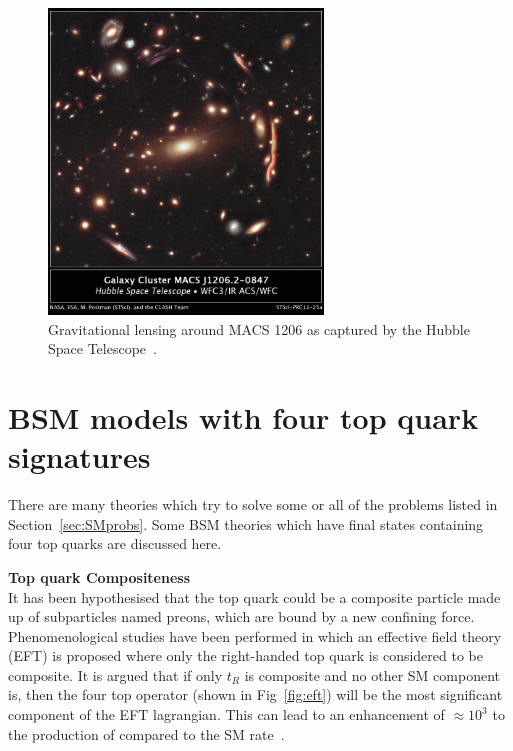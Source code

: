 \begin{figure}[ht!]
\centering
    \includegraphics[width=0.65\textwidth]{images/Theory/lensing2.jpg}
    \caption{Gravitational lensing around MACS 1206 as captured by the Hubble Space Telescope~\cite{Glens}.}
    \label{fig:Glens}
\end{figure}


\section{BSM models with four top quark signatures ~\label{sec:BSMmodels}}

There are many theories which try to solve some or all of the problems listed in Section~\ref{sec:SMprobs}. Some BSM theories which have final states containing four top quarks are discussed here. 

\textbf{Top quark Compositeness}\\
It has been hypothesised that the top quark could be a composite particle made up of subparticles named preons, which are bound by a new confining force. Phenomenological studies have been performed in which an effective field theory (EFT) is proposed where only the right-handed top quark is considered to be composite. It is argued that if only $t_{R}$ is composite and no other SM component is, then the four top operator (shown in Fig~\ref{fig:eft}) will be the most significant component of the EFT lagrangian. This can lead to an enhancement of $\approx 10^3$ to the production of \tttt compared to the SM rate~\cite{Tait2topcomp,Tait1topcomp}.

